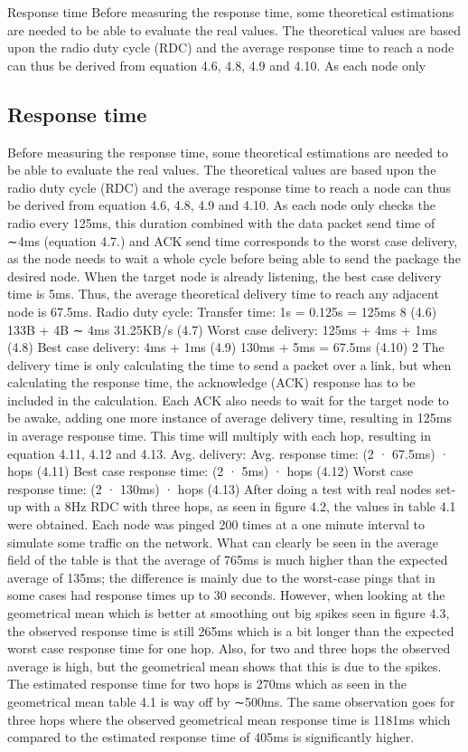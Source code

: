 Response time
Before measuring the response time, some theoretical estimations are needed
to be able to evaluate the real values. The theoretical values are based upon
the radio duty cycle (RDC) and the average response time to reach a node
can thus be derived from equation 4.6, 4.8, 4.9 and 4.10. As each node only

\subsection{Response time}
Before measuring the response time,
	some theoretical estimations are needed to be able to evaluate the real values.
The theoretical values are based upon the radio duty cycle (RDC) and the average response time to reach a node can thus be derived from equation 4.6, 4.8, 4.9 and 4.10.
As each node only checks the radio every 125ms,
	this duration combined with the data packet send time of ∼4ms (equation 4.7.) and ACK send time corresponds to the worst case delivery,
	as the node needs to wait a whole cycle before being able to send the package the desired node.
When the target node is already listening,
	the best case delivery time is 5ms.
Thus,
	the average theoretical delivery time to reach any adjacent node is 67.5ms.
Radio duty cycle:
	Transfer time: 1s = 0.125s = 125ms 8 (4.6) 133B + 4B ∼ 4ms 31.25KB/s (4.7) Worst case delivery: 125ms + 4ms + 1ms (4.8) Best case delivery: 4ms + 1ms (4.9) 130ms + 5ms = 67.5ms (4.10) 2 The delivery time is only calculating the time to send a packet over a link,
	but when calculating the response time,
	the acknowledge (ACK) response has to be included in the calculation.
Each ACK also needs to wait for the target node to be awake,
	adding one more instance of average delivery time,
	resulting in 125ms in average response time.
This time will multiply with each hop,
	resulting in equation 4.11, 4.12 and 4.13.
Avg.
delivery:
	Avg.
response time:
	(2 · 67.5ms) · hops (4.11) Best case response time:
	(2 · 5ms) · hops (4.12) Worst case response time:
	(2 · 130ms) · hops (4.13) After doing a test with real nodes set-up with a 8Hz RDC with three hops,
	as seen in figure 4.2,
	the values in table 4.1 were obtained.
Each node was pinged 200 times at a one minute interval to simulate some traffic on the network.
What can clearly be seen in the average field of the table is that the average of 765ms is much higher than the expected average of 135ms;
	the difference is mainly due to the worst-case pings that in some cases had response times up to 30 seconds.
However,
	when looking at the geometrical mean which is better at smoothing out big spikes seen in figure 4.3,
	the observed response time is still 265ms which is a bit longer than the expected worst case response time for one hop.
Also,
	for two and three hops the observed average is high,
	but the geometrical mean shows that this is due to the spikes.
The estimated response time for two hops is 270ms which as seen in the geometrical mean table 4.1 is way off by ∼500ms.
The same observation goes for three hops where the observed geometrical mean response time is 1181ms which compared to the estimated response time of 405ms is significantly higher.

